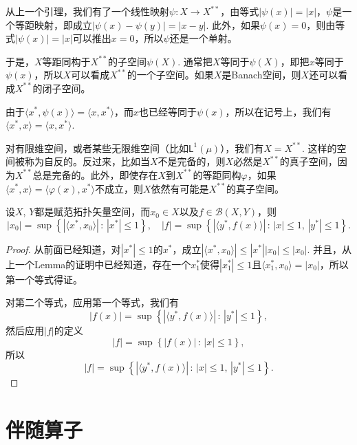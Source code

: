 \begin{para}
从上一个引理，我们有了一个线性映射$\psi:X\to X^{**}$，由等式$|\psi(x)|=|x|$，$\psi$是一个等距映射，即成立$|\psi(x)-\psi(y)|=|x-y|$. 此外，如果$\psi(x)=0$，则由等式$|\psi(x)|=|x|$可以推出$x=0$，所以$\psi$还是一个单射。

于是，$X$等距同构于$X^{**}$的子空间$\psi(X)$. 通常把$X$等同于$\psi(X)$，即把$x$等同于$\psi(x)$，所以$X$可以看成$X^{**}$的一个子空间。如果$X$是Banach空间，则$X$还可以看成$X^{**}$的闭子空间。

由于$\langle x^*,\psi(x)\rangle=\langle x,x^*\rangle$，而$x$也已经等同于$\psi(x)$，所以在记号上，我们有$\langle x^*,x\rangle=\langle x,x^*\rangle$. 

对有限维空间，或者某些无限维空间（比如$\mathsf{L}^1(\mu)$），我们有$X=X^{**}$. 这样的空间被称为自反的。反过来，比如当$X$不是完备的，则$X$必然是$X^{**}$的真子空间，因为$X^{**}$总是完备的。此外，即使存在$X$到$X^{**}$的等距同构$\varphi$，如果$\langle x^*,x\rangle=\langle \varphi(x),x^*\rangle$不成立，则$X$依然有可能是$X^{**}$的真子空间。
\end{para}

\begin{pro}
设$X$, $Y$都是赋范拓扑矢量空间，而$x_0\in X$以及$f\in \mathcal{B}(X,Y)$，则
\[
	|x_0|=\sup\left\{|\langle x^*,x_0\rangle|\,:\, |x^*|\leq 1\right\},\quad
	|f|=\sup \left\{|\langle y^*,f(x)\rangle |\,:\, |x|\leq 1,\, |y^*|\leq 1\right\}.
\]
\end{pro}

\begin{proof}
从前面已经知道，对$|x^*|\leq 1$的$x^*$，成立$|\langle x^*,x_0\rangle|\leq |x^*||x_0|\leq |x_0|$. 并且，从上一个Lemma的证明中已经知道，存在一个$x_1^*$使得$|x_1^*|\leq 1$且$\langle x_1^*,x_0\rangle=|x_0|$，所以第一个等式得证。

对第二个等式，应用第一个等式，我们有
\[
	|f(x)|=\sup\left\{|\langle y^*,f(x)\rangle|\,:\, |y^*|\leq 1\right\},
\]
然后应用$|f|$的定义
\[
	|f|=\sup\left\{|f(x)|\,:\, |x|\leq 1\right\},
\]
所以
\[
	|f|=\sup \left\{|\langle y^*,f(x)\rangle |\,:\, |x|\leq 1,\, |y^*|\leq 1\right\}.
\]
\end{proof}

\section{伴随算子}


